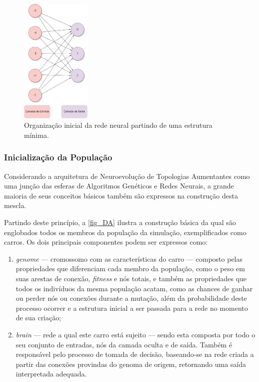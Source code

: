 \begin{figure}[htb]
        \centering
        \caption{\label{fig_CC}Organização inicial da rede neural partindo de uma estrutura mínima.}
        \includegraphics[width=0.3\textwidth]{images/CC.png}
\end{figure}

\subsubsection{Inicialização da População}
Considerando a arquitetura de Neuroevolução de Topologias Aumentantes como uma junção das esferas de Algoritmos
Genéticos e Redes Neurais, a grande maioria de seus conceitos básicos também são expressos na construção desta mescla.

Partindo deste princípio, a \autoref{fig_DA} ilustra a construção básica da qual são englobados todos os membros
da população da simulação, exemplificados como carros. Os dois principais componentes podem ser expressos como:

\begin{enumerate}
	\item \textit{genome} — cromossomo com as características do carro — composto pelas propriedades que diferenciam cada membro da população, como o peso em suas arestas de conexão, \textit{fitness} e nós totais, e também as propriedades que todos os indivíduos da mesma população acatam, como as chances de ganhar ou perder nós ou conexões durante a mutação, além da probabilidade deste processo ocorrer e a estrutura inicial a ser passada para a rede no momento de sua criação; 
	\item \textit{brain} —  rede a qual este carro está sujeito — sendo esta composta por todo o seu conjunto de entradas, nós da camada oculta e de saída. Também é responsável pelo processo de tomada de decisão, baseando-se na rede criada a partir das conexões provindas do genoma de origem, retornando uma saída interpretada adequada.
\end{enumerate}

